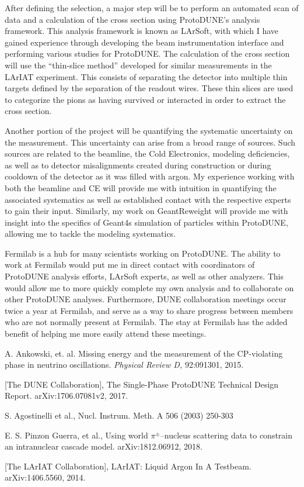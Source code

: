 \documentclass[12pt]{article}
\begin{document}
	After defining the selection, a major step will be to perform an automated scan of data and a calculation of the cross section using ProtoDUNE’s analysis framework. This analysis framework is known as LArSoft, with which I have gained experience through developing the beam instrumentation interface and performing various studies for ProtoDUNE. The calculation of the cross section will use the “thin-slice method” developed for similar measurements in the LArIAT experiment\cite{LArIAT}. This consists of separating the detector into multiple thin targets defined by the separation of the readout wires. These thin slices are used to categorize the pions as having survived or interacted in order to extract the cross section. 
	
	Another portion of the project will be quantifying the systematic uncertainty on the measurement. This uncertainty can arise from a broad range of sources. Such sources are related to the beamline, the Cold Electronics, modeling deficiencies, as well as to detector misalignments created during construction or during cooldown of the detector as it was filled with argon. My experience working with both the beamline and CE will provide me with intuition in quantifying the associated systematics as well as established contact with the respective experts to gain their input. Similarly, my work on GeantReweight will provide me with insight into the specifics of Geant4\textquotesingle s simulation of particles within ProtoDUNE, allowing me to tackle the modeling systematics. 
\\


	Fermilab is a hub for many scientists working on ProtoDUNE. The ability to work at Fermilab would put me in direct contact with coordinators of  ProtoDUNE analysis efforts, LArSoft experts, as well as other analyzers. This would allow me to more quickly complete my own analysis and to collaborate on other ProtoDUNE analyses. Furthermore, DUNE collaboration meetings occur twice a year at Fermilab, and serve as a way to share progress between members who are not normally present at Fermilab. The stay at Fermilab has the added benefit of helping me more easily attend these meetings. 

\begin{thebibliography}{4}
A. Ankowski, et. al. Missing energy and the measurement of the CP-violating phase in neutrino oscillations. \textit{Physical Review D,} 92:091301, 2015.

[The DUNE Collaboration], The Single-Phase ProtoDUNE Technical Design Report. arXiv:1706.07081v2, 2017.

S. Agostinelli et al., Nucl. Instrum. Meth. A 506 (2003) 250-303

E. S. Pinzon Guerra, et al., Using world $\pi^{\pm}$--nucleus scattering data to constrain an intranuclear cascade model. arXiv:1812.06912, 2018.

[The LArIAT Collaboration], LArIAT: Liquid Argon In A Testbeam. arXiv:1406.5560, 2014.
\end{thebibliography}
\newpage
{}
\end{document}

